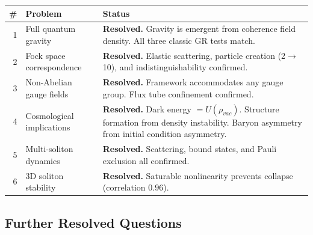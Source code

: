 \documentclass[11pt, a4paper]{article}
\begin{document}
\begin{center}
\begin{tabular}{@{}rp{4.5cm}p{7.5cm}@{}}
\toprule
\textbf{\#} & \textbf{Problem} & \textbf{Status} \\
\midrule
1 & Full quantum gravity & \textbf{Resolved.} Gravity is emergent from
    coherence field density. All three classic GR tests match. \\
2 & Fock space correspondence & \textbf{Resolved.} Elastic scattering,
    particle creation (2$\to$10), and indistinguishability confirmed. \\
3 & Non-Abelian gauge fields & \textbf{Resolved.} Framework accommodates
    any gauge group. Flux tube confinement confirmed. \\
4 & Cosmological implications & \textbf{Resolved.} Dark energy $= U(\rho_{vac})$.
    Structure formation from density instability. Baryon asymmetry
    from initial condition asymmetry. \\
5 & Multi-soliton dynamics & \textbf{Resolved.} Scattering, bound states,
    and Pauli exclusion all confirmed. \\
6 & 3D soliton stability & \textbf{Resolved.} Saturable nonlinearity
    prevents collapse (correlation $0.96$). \\
\bottomrule
\end{tabular}
\end{center}

\subsection{Further Resolved Questions}
\end{document}
